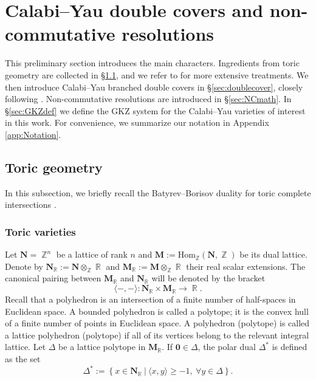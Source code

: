 \documentclass[12pt,a4paper,oneside]{amsart}
\numberwithin{equation}{section}
\theoremstyle{definition}
\theoremstyle{remark}
\DeclareMathOperator{\R}{\mathbb{R}}
\DeclareMathOperator{\Z}{\mathbb{Z}}
\newcommand{\bN}{\mathbf{N}}
\newcommand{\bM}{\mathbf{M}}
\begin{document}
\section{Calabi--Yau double covers and non-commutative resolutions}
\label{sec:CYpreliminaries}
This preliminary section introduces the main characters. Ingredients from toric geometry are collected in \S\ref{sec:toric}, and we refer to \cite{Borisov:1993mirror,Cox:2011tor} for more extensive treatments. We then introduce Calabi--Yau branched double covers in \S\ref{sec:doublecover}, closely following \cite{Hosono:2020gpj,Lee:2020oyt}. Non-commutative resolutions are introduced in \S\ref{sec:NCmath}. In \S\ref{sec:GKZdef} we define the GKZ system for the Calabi--Yau varieties of interest in this work.
For convenience, we summarize our notation in Appendix \ref{app:Notation}.


\subsection{Toric geometry}
\label{sec:toric}
In this subsection, we briefly recall the Batyrev--Borisov duality for toric complete intersections \cite{Batyrev:1994pg}.\par

\subsubsection{Toric varieties}
Let $\bN =\Z^{n}$ be a lattice of rank $n$
and $\bM := \mathrm{Hom}_{\Z} (\bN, \Z )$ be its dual lattice. Denote by $\bN_{\R} := \bN \otimes_{\Z} \R$ and $\bM_{\R} := \bM \otimes_{\Z} \R$ their real scalar extensions. The canonical pairing between $\bM_{\R}$ and $\bN_{\R}$
will be denoted by the bracket 
$$\langle -, -\rangle\colon \bN_{\R} \times \bM_{\R} \to \R.$$
Recall that a polyhedron is an intersection of a finite number of
half-spaces in Euclidean space.
A bounded polyhedron is called a polytope; it is
the convex hull of a finite number of points in Euclidean space.
A polyhedron (polytope) is called a lattice polyhedron (polytope)
if all of its vertices belong to the relevant integral lattice.
Let $\Delta$ be a lattice polytope in \(\mathbf{M}_{\mathbb{R}}\). 
If \(\mathbf{0}\in\Delta\), 
the polar dual $\Delta^{\ast}$ is defined as the set
\begin{equation*}
	\Delta^{\ast} := \left\{ x \in \bN_{\R}~|~\langle x,y \rangle \ge -1,~\forall y \in \Delta  \right\}.
\end{equation*}
\end{document}

